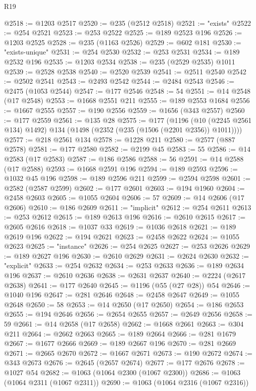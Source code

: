 \begin{lexlean}{R19}
\begin{coremodule}
@2518 := @1203 @2517
@2520 := @235 (@2512 @2518)
@2521 := "exists"
@2522 := @254 @2521
@2523 := @253 @2522
@2525 := @189 @2523 @196
@2526 := @1203 @2525
@2528 := @235 (@1163 @2526)
@2529 := @602 @181
@2530 := "exists-unique"
@2531 := @254 @2530
@2532 := @253 @2531
@2534 := @189 @2532 @196
@2535 := @1203 @2534
@2538 := @235 (@2529 @2535) @1011
@2539 := @2528 @2538
@2540 := @2520 @2539
@2541 := @2511 @2540
@2542 := @2502 @2541
@2543 := @2493 @2542
@2544 := @2484 @2543
@2546 := @2475 (@1053 @2544)
@2547 := @177 @2546
@2548 := 54
@2551 := @14 @2548 (@17 @2548)
@2553 := @1668 @2551 @211
@2555 := @189 @2553 @1684
@2556 := @1667 @2555
@2557 := @190 @2556
@2559 := @1656 (@343 @2557)
@2560 := @177 @2559
@2561 := @135 @28
@2575 := @177
    (@1196 (@10 (@2245 @2561 @134) @1492) @134 (@1498 (@2352 (@235 (@1506 (@2201 @2356)) @1011))))
@2577 := @218 @2561 @134
@2578 := @1228 @211
@2580 := @2577 (@887 @2578)
@2581 := @177 @2580
@2582 := @2199 @45
@2583 := 55
@2586 := @14 @2583 (@17 @2583)
@2587 := @186 @2586
@2588 := 56
@2591 := @14 @2588 (@17 @2588)
@2593 := @1668 @2591 @196
@2594 := @189 @2593
@2596 := @1032 @45 @196
@2598 := @189 @2596 @211
@2599 := @2594 @2598
@2601 := @2582 (@2587 @2599)
@2602 := @177 @2601
@2603 := @194 @1960
@2604 := @2458 @2603
@2605 := @1055 @2604
@2606 := 57
@2609 := @14 @2606 (@17 @2606)
@2610 := @186 @2609
@2611 := "implicit"
@2612 := @254 @2611
@2613 := @253 @2612
@2615 := @189 @2613 @196
@2616 := @2610 @2615
@2617 := @2605 @2616
@2618 := @1037 @33
@2619 := @1036 @2618
@2621 := @189 @2619 @196
@2622 := @194 @2621
@2623 := @2458 @2622
@2624 := @1055 @2623
@2625 := "instance"
@2626 := @254 @2625
@2627 := @253 @2626
@2629 := @189 @2627 @196
@2630 := @2610 @2629
@2631 := @2624 @2630
@2632 := "explicit"
@2633 := @254 @2632
@2634 := @253 @2633
@2636 := @189 @2634 @196
@2637 := @2610 @2636
@2638 := @2631 @2637
@2640 := @2224 (@2617 @2638)
@2641 := @177 @2640
@2645 := @1196 (@55 (@27 @28)) @54
@2646 := @1040 @196
@2647 := @281 @2646
@2648 := @2458 @2647
@2649 := @1055 @2648
@2650 := 58
@2653 := @14 @2650 (@17 @2650)
@2654 := @186 @2653
@2655 := @194 @2646
@2656 := @2654 @2655
@2657 := @2649 @2656
@2658 := 59
@2661 := @14 @2658 (@17 @2658)
@2662 := @1668 @2661
@2663 := @304 @211
@2664 := @2662 @2663
@2665 := @189 @2664
@2666 := @281 @1679
@2667 := @1677 @2666
@2669 := @189 @2667 @196
@2670 := @281 @2669
@2671 := @2665 @2670
@2672 := @1667 @2671
@2673 := @190 @2672
@2674 := @343 @2673
@2676 := @2645 (@2657 @2674)
@2677 := @177 @2676
@2678 := @1027 @54
@2682 := @1063 (@1064 @2300 (@1067 @2300))
@2686 := @1063 (@1064 @2311 (@1067 @2311))
@2690 := @1063 (@1064 @2316 (@1067 @2316))

\end{coremodule}
\end{lexlean}
